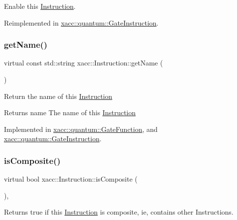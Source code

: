 Enable this \hyperlink{a02460}{Instruction}. 

Reimplemented in \hyperlink{a01276_a7a80474b7fd465271b3313432db2e608}{xacc\+::quantum\+::\+Gate\+Instruction}.

\mbox{\label{a02460_ac7ff23f693e2276edbf3fdac5452792c}} 
\subsubsection{\texorpdfstring{get\+Name()}{getName()}}
{\footnotesize\ttfamily virtual const std\+::string xacc\+::\+Instruction\+::get\+Name (\begin{DoxyParamCaption}{ }\end{DoxyParamCaption})\hspace{0.3cm}{\ttfamily [pure virtual]}}

Return the name of this \hyperlink{a02460}{Instruction}

\begin{DoxyReturn}{Returns}
name The name of this \hyperlink{a02460}{Instruction} 
\end{DoxyReturn}


Implemented in \hyperlink{a01272_af42efb6191267164717d53c469e15d3a}{xacc\+::quantum\+::\+Gate\+Function}, and \hyperlink{a01276_a0db03b9e46eeba1134f0ca2b83ccc842}{xacc\+::quantum\+::\+Gate\+Instruction}.

\mbox{\label{a02460_a4383f1036d0fcfe890ab9c613dbd5f38}} 
\subsubsection{\texorpdfstring{is\+Composite()}{isComposite()}}
{\footnotesize\ttfamily virtual bool xacc\+::\+Instruction\+::is\+Composite (\begin{DoxyParamCaption}{ }\end{DoxyParamCaption})\hspace{0.3cm}{\ttfamily [inline]}, {\ttfamily [virtual]}}

Returns true if this \hyperlink{a02460}{Instruction} is composite, ie, contains other Instructions.

